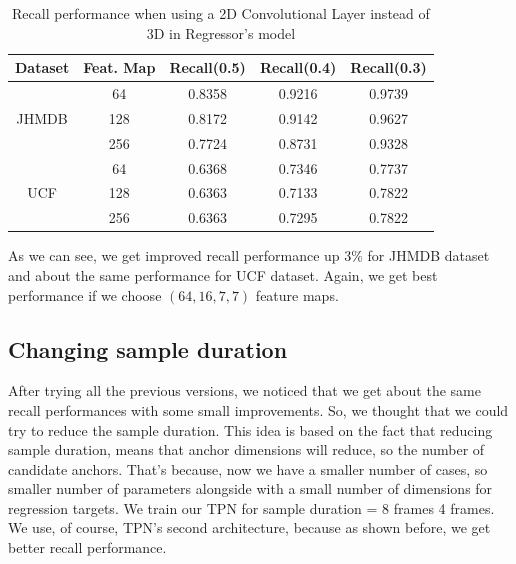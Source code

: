 
\begin{table}[h]
  \centering
  \begin{tabular}{||c | c || c  c  c||}
    \hline
    \textbf{Dataset}  & \textbf{Feat. Map} & \textbf{Recall(0.5)} & \textbf{Recall(0.4)} & \textbf{Recall(0.3)}\\
    \hline
    \multirow{3}{*}{JHMDB} & 64 & 0.8358 & 0.9216 & 0.9739\\
    \cline{2-5}
    {} & 128 & 0.8172 & 0.9142 & 0.9627 \\
    \cline{2-5}
    {} & 256 & 0.7724 & 0.8731 & 0.9328 \\
    \hline
    \multirow{3}{*}{UCF} & 64 & 0.6368 & 0.7346 & 0.7737 \\ 
    \cline{2-5}
    {} & 128 & 0.6363 & 0.7133 & 0.7822 \\
    \cline{2-5}
    {} & 256 &  0.6363 & 0.7295 & 0.7822 \\
    \hline

  \end{tabular}
  \caption{Recall performance when using a 2D Convolutional Layer instead of 3D in Regressor's model}
  \label{table:reg_2_2}
\end{table}

As we can see, we get improved recall performance up 3\% for JHMDB dataset and about the same performance for UCF dataset. Again, we get best performance
if we choose $(64, 16, 7, 7)$ feature maps.

\subsection{Changing sample duration}
After trying all the previous versions, we noticed that we get about the same recall performances with some small improvements. So, we thought that we could try
to reduce the sample duration. This idea is based on the fact that reducing sample duration, means that anchor dimensions will reduce, so the number of
candidate anchors. That's because, now we have a smaller number of cases, so smaller number of parameters alongside with a small number of dimensions for regression targets.
We train our TPN for sample duration = 8 frames 4 frames. We use, of course, TPN's second  architecture, because as shown before, we get better recall performance.

